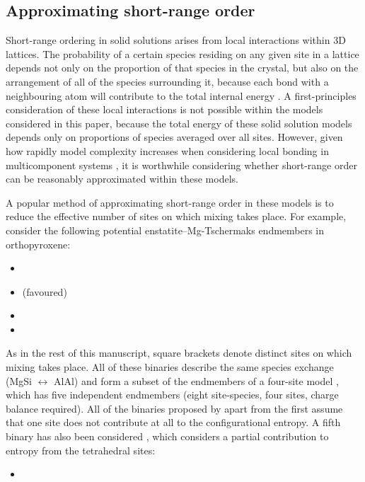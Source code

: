 \documentclass[preprint,12pt]{elsarticle}
\begin{document}
\subsection{Approximating short-range order}
\label{sec:sro}
Short-range ordering in solid solutions arises from local interactions within 3D lattices. The probability of a certain species residing on any given site in a lattice depends not only on the proportion of that species in the crystal, but also on the arrangement of all of the species surrounding it, because each bond with a neighbouring atom will contribute to the total internal energy \citep[e.g.][]{Bethe1935}. A first-principles consideration of these local interactions is not possible within the models considered in this paper, because the total energy of these solid solution models depends only on proportions of species averaged over all sites. However, given how rapidly model complexity increases when considering local bonding in multicomponent systems \citep[e.g.][]{Inden2001}, it is worthwhile considering whether short-range order can be reasonably approximated within these models.

A popular method of approximating short-range order in these models is to reduce the effective number of sites on which mixing takes place. For example, \citet{SLB2011} consider the following potential enstatite--Mg-Tschermaks endmembers in orthopyroxene:
\begin{itemize}
\item {}
\item {} (favoured)
\item {}
\item {}
\end{itemize}
As in the rest of this manuscript, square brackets denote distinct sites on which mixing takes place. All of these binaries describe the same species exchange (MgSi $\leftrightarrow$ AlAl) and form a subset of the endmembers of a four-site model , which has five independent endmembers (eight site-species, four sites, charge balance required). All of the binaries proposed by \citet{SLB2011} apart from the first assume that one site does not contribute at all to the configurational entropy. A fifth binary has also been considered \citep{JH2015,Holland2018}, which considers a partial contribution to entropy from the tetrahedral sites:
\begin{itemize} 
\item {}
\end{itemize}
\end{document}
